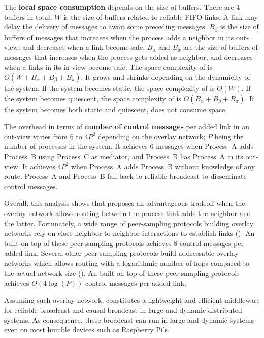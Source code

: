 \noindent The \textbf{local space consumption} depends on the size of
buffers. There are 4 buffers in total. $W$ is the size of buffers related to
reliable FIFO links. A link may delay the delivery of messages to await some
preceding messages. $B_\beta$ is the size of buffers of messages that increases when
the process adds a neighbor in its out-view, and decreases when a link become
safe. $B_\alpha$ and $B_\pi$ are the size of buffers of messages that increases
when the process gets added as neighbor, and decreases when a links in its
in-view become safe. The space complexity of \RPCBROADCAST is
$O(W  + B_\alpha + B_\beta + B_\pi)$. It grows and shrinks depending on the dynamicity
of the system. If the system becomes static, the space complexity of
\RPCBROADCAST is $O(W)$. If the system becomes quiescent, the space complexity
of \RPCBROADCAST is $O(B_\alpha+ B_\beta + B_\pi)$.  If the system becomes both
static and quiescent, \RPCBROADCAST does not consume
space. 

\noindent The overhead in terms of \textbf{number of control messages} per added
link in an out-view varies from $6$ to $4P^2$ depending on the overlay network;
$P$ being the number of processes in the system. It achieves $6$ messages when
Process~A adds Process~B using Process~C as mediator, and Process~B has
Process~A in its out-view. It achieves $4P^2$ when Process~A adds Process~B
without knowledge of any route. Process~A and Process~B fall back to reliable
broadcast to disseminate control messages.

Overall, this analysis shows that \RPCBROADCAST proposes an advantageous
tradeoff when the overlay network allows routing between the process that adds
the neighbor and the latter. Fortunately, a wide range of peer-sampling
protocols building overlay networks rely on close neighbor-to-neighbor
interactions to establish links (\REF). An \RPCBROADCAST built on top of these
peer-sampling protocols achieves $8$ control messages per added link. Several
other peer-sampling protocols build addressable overlay networks which allows
routing with a logarithmic number of hops compared to the actual network size
(\REF). An \RPCBROADCAST built on top of these peer-sampling protocols achieves
$O(4\log(P))$ control messages per added link.

Assuming such overlay network, \RPCBROADCAST constitutes a lightweight and
efficient middleware for reliable broadcast and causal broadcast in large and
dynamic distributed systems. As consequence, these broadcast can run in large
and dynamic systems even on most humble devices such as Raspberry Pi's.


